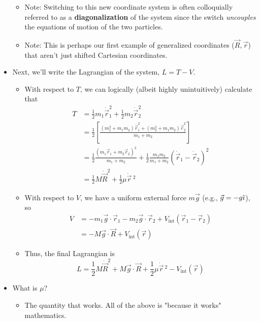 \documentclass[../notes.tex]{subfiles}
\begin{document}
\begin{itemize}
\begin{itemize}
        \item Note: Switching to this new coordinate system is often colloquially referred to as a \textbf{diagonalization} of the system since the switch \emph{uncouples} the equations of motion of the two particles.
        \item Note: This is perhaps our first example of generalized coordinates ($\vec{R},\vec{r}$) that aren't just shifted Cartesian coordinates.
    \end{itemize}
    \item Next, we'll write the Lagrangian of the system, $L=T-V$.
    \begin{itemize}
        \item With respect to $T$, we can logically (albeit highly unintuitively) calculate that
        \begin{align*}
            T &= \frac{1}{2}m_1\dot{\vec{r}}_1^2+\frac{1}{2}m_2\dot{\vec{r}}_2^2\\
            &= \frac{1}{2}\left[ \frac{(m_1^2+m_1m_2)\dot{\vec{r}}_1^2+(m_2^2+m_1m_2)\dot{\vec{r}}_2^2}{m_1+m_2} \right]\\
            &= \frac{1}{2}\frac{(m_1\vec{r}_1+m_2\vec{r}_2)^2}{m_1+m_2}+\frac{1}{2}\frac{m_1m_2}{m_1+m_2}(\dot{\vec{r}}_1-\dot{\vec{r}}_2)^2\\
            &= \frac{1}{2}M\dot{\vec{R}}^2+\frac{1}{2}\mu\dot{\vec{r}}{\,}^2
        \end{align*}
        \item With respect to $V$, we have a uniform external force $m\vec{g}$ (e.g., $\vec{g}=-g\hat{\imath}$), so
        \begin{align*}
            V &= -m_1\vec{g}\cdot\vec{r}_1-m_2\vec{g}\cdot\vec{r}_2+V_\text{int}(\vec{r}_1-\vec{r}_2)\\
            &= -M\vec{g}\cdot\vec{R}+V_\text{int}(\vec{r})
        \end{align*}
        \item Thus, the final Lagrangian is
        \begin{equation*}
            L = \frac{1}{2}M\dot{\vec{R}}^2+M\vec{g}\cdot\vec{R}+\frac{1}{2}\mu\dot{\vec{r}}{\,}^2-V_\text{int}(\vec{r})
        \end{equation*}
    \end{itemize}
    \item What is $\mu$?
    \begin{itemize}
        \item The quantity that works. All of the above is "because it works" mathematics.

\end{itemize}
\end{itemize}
\end{document}
